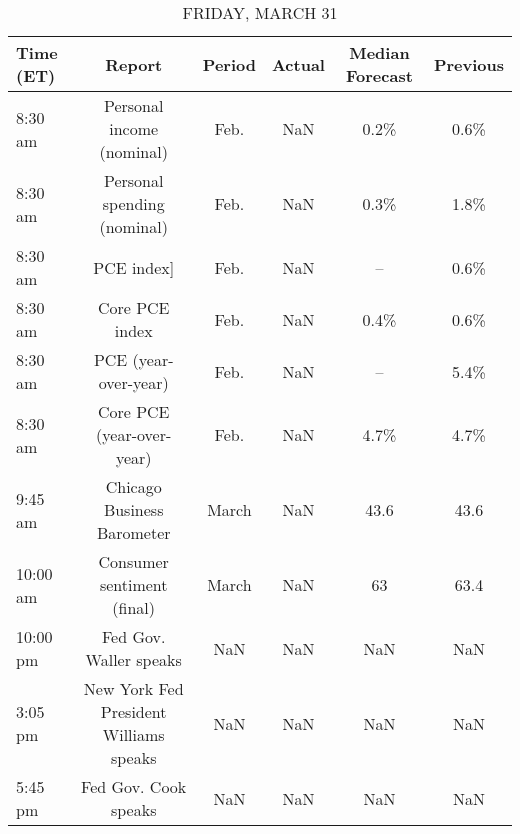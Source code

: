 \documentclass{article}%
\begin{document}
\begin{table}[htbp]%
\caption{FRIDAY, MARCH 31}%
\centering%
\begin{adjustbox}{width=1\textwidth}%
\begin{tabular}{lccccc}
\toprule
Time (ET) &                                 Report & Period & Actual & Median Forecast & Previous \\
\midrule
  8:30 am &              Personal income (nominal) &   Feb. &    NaN &            0.2\% &     0.6\% \\
  8:30 am &            Personal spending (nominal) &   Feb. &    NaN &            0.3\% &     1.8\% \\
  8:30 am &                             PCE index] &   Feb. &    NaN &              -- &     0.6\% \\
  8:30 am &                         Core PCE index &   Feb. &    NaN &            0.4\% &     0.6\% \\
  8:30 am &                   PCE (year-over-year) &   Feb. &    NaN &              -- &     5.4\% \\
  8:30 am &              Core PCE (year-over-year) &   Feb. &    NaN &            4.7\% &     4.7\% \\
  9:45 am &             Chicago Business Barometer &  March &    NaN &            43.6 &     43.6 \\
 10:00 am &             Consumer sentiment (final) &  March &    NaN &              63 &     63.4 \\
 10:00 pm &                 Fed Gov. Waller speaks &    NaN &    NaN &             NaN &      NaN \\
  3:05 pm & New York Fed President Williams speaks &    NaN &    NaN &             NaN &      NaN \\
  5:45 pm &                   Fed Gov. Cook speaks &    NaN &    NaN &             NaN &      NaN \\
\bottomrule
\end{tabular}
%
\end{adjustbox}%
\end{table}
\end{document}
